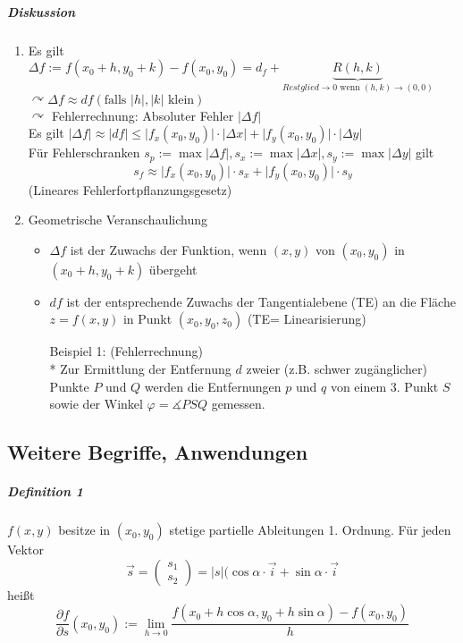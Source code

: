 \documentclass[a4paper]{scrartcl}
\begin{document}
\subparagraph{Diskussion}
\begin{enumerate}
\item Es gilt
$ \Delta f := f(x_0+h,y_0+k) - f(x_0,y_0) = d_f + \underbrace{R(h,k)}_{{Restglied } \to 0 \text{ wenn } (h,k) \to (0,0)}$\\
$\curvearrowright \Delta f \approx df (\text{falls } \lvert h \rvert, \lvert k \rvert \text{ klein})$\\
$\curvearrowright$ Fehlerrechnung: Absoluter Fehler $\lvert \Delta f \rvert$\\
Es gilt $\lvert \Delta f \rvert \approx \lvert df \rvert \leq \lvert f_x(x_0,y_0) \rvert \cdot \lvert \Delta x \rvert + \lvert f_y(x_0,y_0)\rvert \cdot \lvert \Delta y \rvert$\\
Für Fehlerschranken $s_p := \max{\lvert \Delta f \rvert}, s_x := \max{\lvert \Delta x \rvert}, s_y  := \max{\lvert \Delta y \rvert}$ gilt
\[ s_f \approx \lvert f_x(x_0,y_0) \rvert \cdot s_x + \lvert f_y(x_0,y_0) \rvert \cdot s_y \] (Lineares Fehlerfortpflanzungsgesetz)
\item Geometrische Veranschaulichung
\begin{itemize}
\item $\Delta f$ ist der Zuwachs der Funktion, wenn $(x,y)$ von $(x_0,y_0)$ in $(x_0 + h, y_0 + k)$ übergeht
\item $df$ ist der entsprechende Zuwachs der Tangentialebene (TE) an die Fläche $z=f(x,y)$ in Punkt $(x_0,y_0,z_0)$ (TE= Linearisierung)

Beispiel 1: (Fehlerrechnung)\\*
Zur Ermittlung der Entfernung $d$ zweier (z.B. schwer zugänglicher) Punkte $P$ und $Q$ werden die Entfernungen $p$ und $q$ von einem 3. Punkt $S$ sowie der Winkel $\varphi = \measuredangle PSQ$ gemessen.
\end{itemize} 
\end{enumerate}


\subsection{Weitere Begriffe, Anwendungen}
\subparagraph{Definition 1} $f(x,y)$ besitze in $(x_0,y_0)$ stetige partielle Ableitungen 1. Ordnung. Für jeden Vektor
\[\vec{s} = \begin{pmatrix} s_1 \\ s_2 \end{pmatrix} = \lvert s \rvert (\cos{\alpha} \cdot \vec{i} + \sin{\alpha} \cdot \vec{i} \]
heißt
\[\frac{\partial f}{\partial s} (x_0,y_0) := \lim\limits_{h \to 0} \frac{f(x_0 + h \cos{\alpha}, y_0 + h \sin{\alpha}) - f(x_0,y_0)}{h}\]
\end{document}

